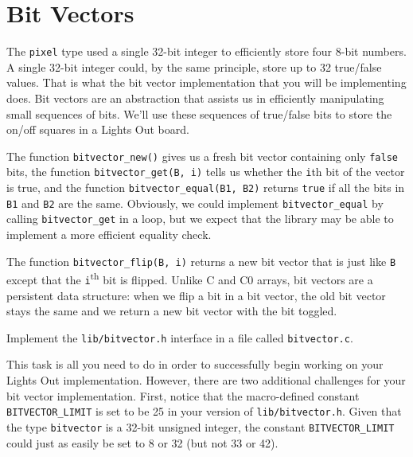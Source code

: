 \documentclass[12pt]{exam}
\begin{document}
\clearpage
\section{Bit Vectors}
\label{sec:bitarray}

The \lstinline'pixel' type used a single 32-bit integer to efficiently
store four 8-bit numbers. A single 32-bit integer could, by the same
principle, store up to 32 true/false values. That is what the bit
vector implementation that you will be implementing does. Bit vectors
are an abstraction that assists us in efficiently manipulating small
sequences of bits.  We'll use these sequences of true/false bits to
store the on/off squares in a Lights Out board.

The function \lstinline'bitvector_new()' gives us a fresh bit vector
containing only \lstinline'false' bits, the function
\lstinline'bitvector_get(B, i)' tells us whether the \lstinline'i'th
bit of the vector is true, and the function
\lstinline'bitvector_equal(B1, B2)' returns \lstinline'true' if all
the bits in \lstinline'B1' and \lstinline'B2' are the same. Obviously,
we could implement \lstinline'bitvector_equal' by calling
\lstinline'bitvector_get' in a loop, but we expect that the library
may be able to implement a more efficient equality check.

The function \lstinline'bitvector_flip(B, i)' returns a new bit vector
that is just like \lstinline'B' except that the
\lstinline'i'\textsuperscript{th} bit is flipped.  Unlike C and C0
arrays, bit vectors are a persistent data structure: when we flip a
bit in a bit vector, the old bit vector stays the same and we return a
new bit vector with the bit toggled.

\begin{task}[5]
Implement the \lstinline'lib/bitvector.h' interface in a file called
\lstinline'bitvector.c'.
\end{task}

This task is all you need to do in order to successfully begin working
on your Lights Out implementation. However, there are two additional
challenges for your bit vector implementation. First, notice that the
macro-defined constant \lstinline'BITVECTOR_LIMIT' is set to be 25 in
your version of \lstinline'lib/bitvector.h'. Given that the type
\lstinline'bitvector' is a 32-bit unsigned integer, the constant
\lstinline'BITVECTOR_LIMIT' could just as easily be set to 8 or 32
(but not 33 or 42).
\end{document}
